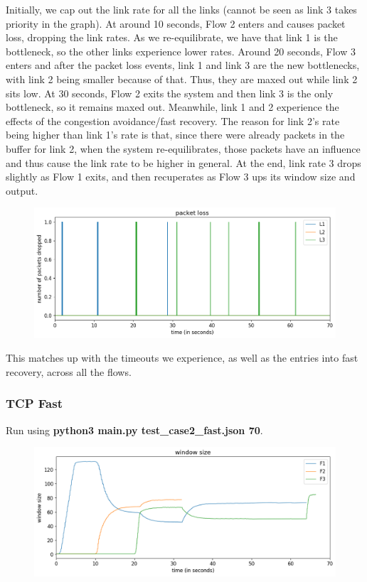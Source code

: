 \documentclass{article}
\begin{document}
Initially, we cap out the link rate for all the links (cannot be seen as link 3 takes priority in the graph). At around 10 seconds, Flow 2 enters and causes packet loss, dropping the link rates. As we re-equilibrate, we have that link 1 is the bottleneck, so the other links experience lower rates. Around 20 seconds, Flow 3 enters and after the packet loss events, link 1 and link 3 are the new bottlenecks, with link 2 being smaller because of that. Thus, they are maxed out while link 2 sits low. At 30 seconds, Flow 2 exits the system and then link 3 is the only bottleneck, so it remains maxed out. Meanwhile, link 1 and 2 experience the effects of the congestion avoidance/fast recovery. The reason for link 2's rate being higher than link 1's rate is that, since there were already packets in the buffer for link 2, when the system re-equilibrates, those packets have an influence and thus cause the link rate to be higher in general. At the end, link rate 3 drops slightly as Flow 1 exits, and then recuperates as Flow 3 ups its window size and output.

\begin{figure}[H]
\centering
\includegraphics[width = \textwidth]{test_case2_reno packet loss.png}
\end{figure}

This matches up with the timeouts we experience, as well as the entries into fast recovery, across all the flows.

\subsubsection{TCP Fast}

Run using \textbf{python3 main.py test\_case2\_fast.json 70}.

\begin{figure}[H]
\centering
\includegraphics[width = \textwidth]{test_case2_fast window size.png}
\end{figure}
\end{document}
